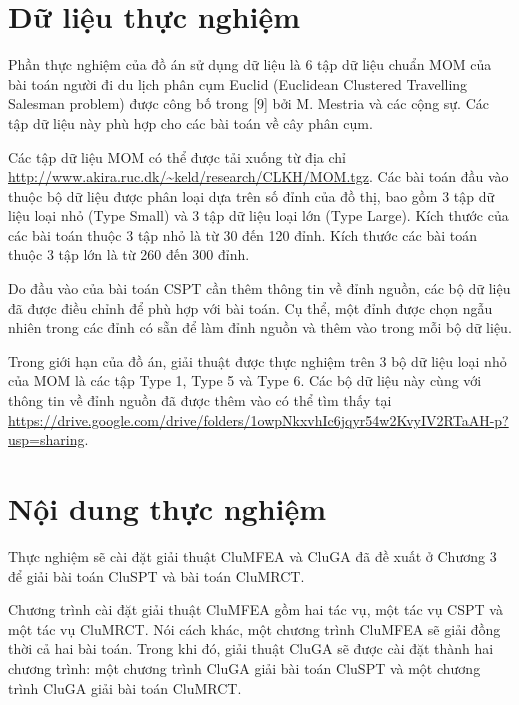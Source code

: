 \section{Dữ liệu thực nghiệm} \label{chap_mfeaProposed:sec:dulieuthucnghiem}

Phần thực nghiệm của đồ án sử dụng dữ liệu là 6 tập dữ liệu chuẩn MOM của bài toán người đi du lịch phân cụm Euclid (Euclidean Clustered Travelling Salesman problem) được công bố trong  [9] bởi M. Mestria và các cộng sự. Các tập dữ liệu này phù hợp cho các bài toán về cây phân cụm.

Các tập dữ liệu MOM có thể được tải xuống từ địa chỉ \url{http://www.akira.ruc.dk/~keld/research/CLKH/MOM.tgz}. Các bài toán đầu vào thuộc bộ dữ liệu được phân loại dựa trên số đỉnh của đồ thị, bao gồm 3 tập dữ liệu loại nhỏ (Type Small) và 3 tập dữ liệu loại lớn (Type Large). Kích thước của các bài toán thuộc 3 tập nhỏ là từ 30 đến 120 đỉnh. Kích thước các bài toán thuộc 3 tập lớn là từ 260 đến 300 đỉnh.

Do đầu vào của bài toán CSPT cần thêm thông tin về đỉnh nguồn, các bộ dữ liệu đã được điều chỉnh để phù hợp với bài toán. Cụ thể, một đỉnh được chọn ngẫu nhiên trong các đỉnh có sẵn để làm đỉnh nguồn và thêm vào trong mỗi bộ dữ liệu.

Trong giới hạn của đồ án, giải thuật được thực nghiệm trên 3 bộ dữ liệu loại nhỏ của MOM là các tập Type 1, Type 5 và Type 6. Các bộ dữ liệu này cùng với thông tin về đỉnh nguồn đã được thêm vào có thể tìm thấy tại  \url{https://drive.google.com/drive/folders/1owpNkxvhIc6jqyr54w2KvyIV2RTaAH-p?usp=sharing}.

 
\section{Nội dung thực nghiệm} \label{chap_mfeaProposed:sec:caidatthucnghiem}
Thực nghiệm sẽ cài đặt giải thuật CluMFEA và CluGA đã đề xuất ở Chương 3 để giải bài toán CluSPT và bài toán CluMRCT.

Chương trình cài đặt giải thuật CluMFEA gồm hai tác vụ, một tác vụ CSPT và một tác vụ CluMRCT. Nói cách khác, một chương trình CluMFEA sẽ giải đồng thời cả hai bài toán. Trong khi đó, giải thuật CluGA sẽ được cài đặt thành hai chương trình: một chương trình CluGA giải bài toán CluSPT và một chương trình CluGA giải bài toán CluMRCT. 

